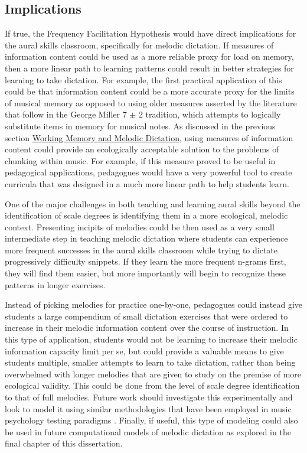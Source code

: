 \documentclass[12pt,]{book}
\begin{document}
\hypertarget{implications}{%
\subsection{Implications}\label{implications}}

If true, the Frequency Facilitation Hypothesis would have direct implications for the aural skills classroom, specifically for melodic dictation.
If measures of information content could be used as a more reliable proxy for load on memory, then a more linear path to learning patterns could result in better strategies for learning to take dictation.
For example, the first practical application of this could be that information content could be a more accurate proxy for the limits of musical memory as opposed to using older measures asserted by the literature that follow in the George Miller 7 \(\pm\) 2 tradition, which attempts to logically substitute items in memory for musical notes.
As discussed in the previous section \protect\hyperlink{working-memory-and-melodic-dictation}{Working Memory and Melodic Dictation}, using measures of information content could provide an ecologically acceptable solution to the problems of chunking within music.
For example, if this measure proved to be useful in pedagogical applications, pedagogues would have a very powerful tool to create curricula that was designed in a much more linear path to help students learn.

One of the major challenges in both teaching and learning aural skills beyond the identification of scale degrees is identifying them in a more ecological, melodic context.
Presenting incipits of melodies could be then used as a very small intermediate step in teaching melodic dictation where students can experience more frequent successes in the aural skills classroom while trying to dictate progressively difficulty snippets.
If they learn the more frequent n-grams first, they will find them easier, but more importantly will begin to recognize these patterns in longer exercises.

Instead of picking melodies for practice one-by-one, pedagogues could instead give students a large compendium of small dictation exercises that were ordered to increase in their melodic information content over the course of instruction.
In this type of application, students would not be learning to increase their melodic information capacity limit per se, but could provide a valuable means to give students multiple, smaller attempts to learn to take dictation, rather than being overwhelmed with longer melodies that are given to study on the premise of more ecological validity.
This could be done from the level of scale degree identification to that of full melodies.
Future work should investigate this experimentally and look to model it using similar methodologies that have been employed in music psychology testing paradigms \citep{harrisonApplyingModernPsychometric2017a, wolfGradesReflectDevelopment2014}.
Finally, if useful, this type of modeling could also be used in future computational models of melodic dictation as explored in the final chapter of this dissertation.
\end{document}
